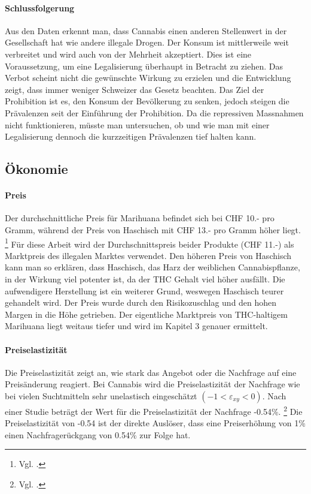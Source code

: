 \documentclass[../main.tex]{subfiles}
\begin{document}
	\paragraph{Schlussfolgerung}
	Aus den Daten erkennt man, dass Cannabis einen anderen Stellenwert in der Gesellschaft hat wie andere illegale Drogen.
	Der Konsum ist mittlerweile weit verbreitet und wird auch von der Mehrheit akzeptiert.
	Dies ist eine Voraussetzung, um eine Legalisierung überhaupt in Betracht zu ziehen.
	Das Verbot scheint nicht die gewünschte Wirkung zu erzielen und die Entwicklung zeigt, dass immer weniger Schweizer das Gesetz beachten.
	Das Ziel der Prohibition ist es, den Konsum der Bevölkerung zu senken, jedoch steigen die Prävalenzen seit der Einführung der Prohibition.
	Da die repressiven Massnahmen nicht funktionieren, müsste man untersuchen, ob und wie man mit einer Legalisierung dennoch die kurzzeitigen Prävalenzen tief halten kann.
	
	
	\subsection{Ökonomie}
	
	\paragraph{Preis}
	Der durchschnittliche Preis für Marihuana befindet sich bei CHF 10.- pro Gramm, während der Preis von Haschisch mit CHF 13.- pro Gramm höher liegt.%
	\footnote{Vgl. \cite[12]{zobel}.}
	Für diese Arbeit wird der Durchschnittspreis beider Produkte (CHF 11.-) als Marktpreis des illegalen Marktes verwendet.
	Den höheren Preis von Haschisch kann man so erklären, dass Haschisch, das Harz der weiblichen Cannabispflanze, in der Wirkung viel potenter ist, da der THC Gehalt viel höher ausfällt.
	Die aufwendigere Herstellung ist ein weiterer Grund, weswegen Haschisch teurer gehandelt wird.
	Der Preis wurde durch den Risikozuschlag und den hohen Margen in die Höhe getrieben.
	Der eigentliche Marktpreis von THC-haltigem Marihuana liegt weitaus tiefer und wird im Kapitel 3 genauer ermittelt.
	
	\paragraph{Preiselastizität}
	Die Preiselastizität zeigt an, wie stark das Angebot oder die Nachfrage auf eine Preisänderung reagiert.
	Bei Cannabis wird die Preiselastizität der Nachfrage wie bei vielen Suchtmitteln sehr unelastisch eingeschätzt $(-1<\varepsilon_{xy}<0)$. 
	Nach einer Studie beträgt der Wert für die Preiselastizität der Nachfrage -0.54\%.%
	\footnote{Vgl. \cite[24]{golzar}.}
	Die Preiselastizität von -0.54 ist der direkte Auslöser, dass eine Preiserhöhung von 1\% einen Nachfragerückgang von 0.54\% zur Folge hat.\\
	
\end{document}
